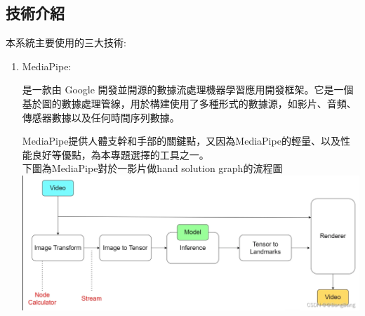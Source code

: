\documentclass[12pt,a4paper]{report}
\begin{document}
\begin{CJK*}{UTF8}{bkai}
    \section{技術介紹}
    \par
    本系統主要使用的三大技術:
    \begin{enumerate}
        \item MediaPipe:
              \par
              是一款由 Google 開發並開源的數據流處理機器學習應用開發框架。它是一個基於圖的數據處理管線，用於構建使用了多種形式的數據源，如影片、音頻、傳感器數據以及任何時間序列數據。
              \par
              MediaPipe提供人體支幹和手部的關鍵點，又因為MediaPipe的輕量、以及性能良好等優點，為本專題選擇的工具之一。\\
              下圖為MediaPipe對於一影片做hand solution graph的流程圖\\
              \includegraphics[width=5in]{mediapipe.png}



\end{enumerate}
\end{CJK*}
\end{document}
